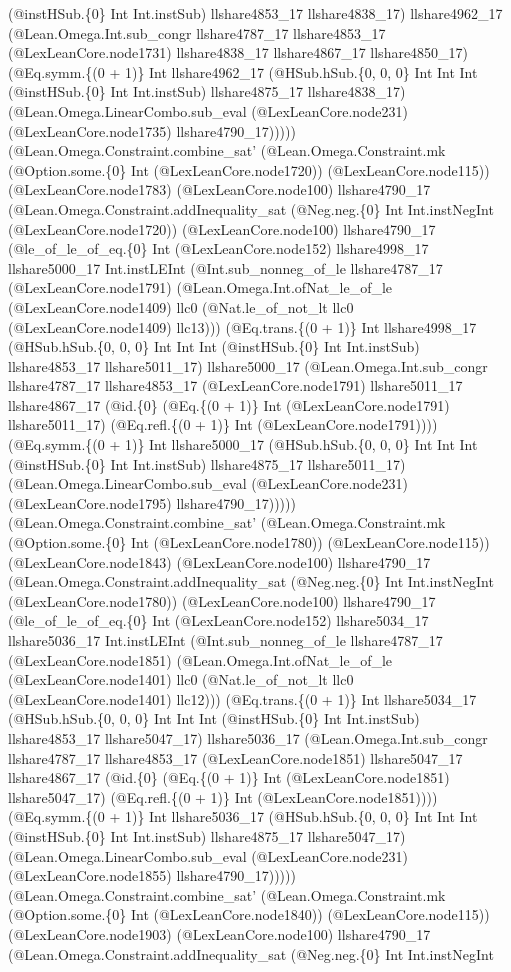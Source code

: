 \documentclass[11pt]{article}
\begin{document}
(@instHSub.\{0\} Int Int.instSub) llshare4853\_17 llshare4838\_17) llshare4962\_17 (@Lean.Omega.Int.sub\_congr llshare4787\_17 llshare4853\_17 (@LexLeanCore.node1731) llshare4838\_17 llshare4867\_17 llshare4850\_17) (@Eq.symm.\{(0 + 1)\} Int llshare4962\_17 (@HSub.hSub.\{0, 0, 0\} Int Int Int (@instHSub.\{0\} Int Int.instSub) llshare4875\_17 llshare4838\_17) (@Lean.Omega.LinearCombo.sub\_eval (@LexLeanCore.node231) (@LexLeanCore.node1735) llshare4790\_17))))) (@Lean.Omega.Constraint.combine\_sat' (@Lean.Omega.Constraint.mk (@Option.some.\{0\} Int (@LexLeanCore.node1720)) (@LexLeanCore.node115)) (@LexLeanCore.node1783) (@LexLeanCore.node100) llshare4790\_17 (@Lean.Omega.Constraint.addInequality\_sat (@Neg.neg.\{0\} Int Int.instNegInt (@LexLeanCore.node1720)) (@LexLeanCore.node100) llshare4790\_17 (@le\_of\_le\_of\_eq.\{0\} Int (@LexLeanCore.node152) llshare4998\_17 llshare5000\_17 Int.instLEInt (@Int.sub\_nonneg\_of\_le llshare4787\_17 (@LexLeanCore.node1791) (@Lean.Omega.Int.ofNat\_le\_of\_le (@LexLeanCore.node1409) llc0 (@Nat.le\_of\_not\_lt llc0 (@LexLeanCore.node1409) llc13))) (@Eq.trans.\{(0 + 1)\} Int llshare4998\_17 (@HSub.hSub.\{0, 0, 0\} Int Int Int (@instHSub.\{0\} Int Int.instSub) llshare4853\_17 llshare5011\_17) llshare5000\_17 (@Lean.Omega.Int.sub\_congr llshare4787\_17 llshare4853\_17 (@LexLeanCore.node1791) llshare5011\_17 llshare4867\_17 (@id.\{0\} (@Eq.\{(0 + 1)\} Int (@LexLeanCore.node1791) llshare5011\_17) (@Eq.refl.\{(0 + 1)\} Int (@LexLeanCore.node1791)))) (@Eq.symm.\{(0 + 1)\} Int llshare5000\_17 (@HSub.hSub.\{0, 0, 0\} Int Int Int (@instHSub.\{0\} Int Int.instSub) llshare4875\_17 llshare5011\_17) (@Lean.Omega.LinearCombo.sub\_eval (@LexLeanCore.node231) (@LexLeanCore.node1795) llshare4790\_17))))) (@Lean.Omega.Constraint.combine\_sat' (@Lean.Omega.Constraint.mk (@Option.some.\{0\} Int (@LexLeanCore.node1780)) (@LexLeanCore.node115)) (@LexLeanCore.node1843) (@LexLeanCore.node100) llshare4790\_17 (@Lean.Omega.Constraint.addInequality\_sat (@Neg.neg.\{0\} Int Int.instNegInt (@LexLeanCore.node1780)) (@LexLeanCore.node100) llshare4790\_17 (@le\_of\_le\_of\_eq.\{0\} Int (@LexLeanCore.node152) llshare5034\_17 llshare5036\_17 Int.instLEInt (@Int.sub\_nonneg\_of\_le llshare4787\_17 (@LexLeanCore.node1851) (@Lean.Omega.Int.ofNat\_le\_of\_le (@LexLeanCore.node1401) llc0 (@Nat.le\_of\_not\_lt llc0 (@LexLeanCore.node1401) llc12))) (@Eq.trans.\{(0 + 1)\} Int llshare5034\_17 (@HSub.hSub.\{0, 0, 0\} Int Int Int (@instHSub.\{0\} Int Int.instSub) llshare4853\_17 llshare5047\_17) llshare5036\_17 (@Lean.Omega.Int.sub\_congr llshare4787\_17 llshare4853\_17 (@LexLeanCore.node1851) llshare5047\_17 llshare4867\_17 (@id.\{0\} (@Eq.\{(0 + 1)\} Int (@LexLeanCore.node1851) llshare5047\_17) (@Eq.refl.\{(0 + 1)\} Int (@LexLeanCore.node1851)))) (@Eq.symm.\{(0 + 1)\} Int llshare5036\_17 (@HSub.hSub.\{0, 0, 0\} Int Int Int (@instHSub.\{0\} Int Int.instSub) llshare4875\_17 llshare5047\_17) (@Lean.Omega.LinearCombo.sub\_eval (@LexLeanCore.node231) (@LexLeanCore.node1855) llshare4790\_17))))) (@Lean.Omega.Constraint.combine\_sat' (@Lean.Omega.Constraint.mk (@Option.some.\{0\} Int (@LexLeanCore.node1840)) (@LexLeanCore.node115)) (@LexLeanCore.node1903) (@LexLeanCore.node100) llshare4790\_17 (@Lean.Omega.Constraint.addInequality\_sat (@Neg.neg.\{0\} Int Int.instNegInt 
\end{document}
